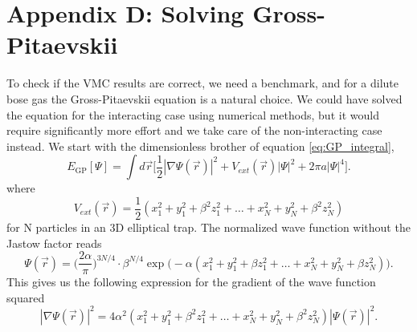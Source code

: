 \documentclass[norsk,a4paper,12pt]{article}
\begin{document}
\section{Appendix D: Solving Gross-Pitaevskii} \label{sec:appendix_d}
To check if the VMC results are correct, we need a benchmark, and for a dilute bose gas the Gross-Pitaevskii equation is a natural choice. We could have solved the equation for the interacting case using numerical methods, but it would require significantly more effort and we take care of the non-interacting case instead. We start with the dimensionless brother of equation \ref{eq:GP_integral},
\begin{equation}
E_{\text{GP}}[\Psi]=\int d\vec{r}\bigg[\frac{1}{2}|\nabla\Psi(\vec{r})|^2+V_{ext}(\vec{r})|\Psi|^2+2\pi a|\Psi|^4\bigg].
\end{equation}
where 
\begin{equation}
V_{ext}(\vec{r})=\frac{1}{2}(x_1^2+y_1^2+\beta^2 z_1^2 + \hdots + x_N^2+y_N^2+\beta^2 z_N^2)
\end{equation}
for N particles in an 3D elliptical trap. The normalized wave function without the Jastow factor reads
\begin{equation}
\Psi(\vec{r})=\bigg(\frac{2\alpha}{\pi}\bigg)^{3N/4}\cdot\beta^{N/4}\exp\big(-\alpha(x_1^2+y_1^2+\beta z_1^2 + \hdots + x_N^2+y_N^2+\beta z_N^2)\big).
\end{equation}
This gives us the following expression for the gradient of the wave function squared
\begin{equation}
|\nabla\Psi(\vec{r})|^2=4\alpha^2(x_1^2+y_1^2+\beta^2 z_1^2 + \hdots + x_N^2+y_N^2+\beta^2 z_N^2)|\Psi(\vec{r})|^2.
\end{equation}
\end{document}

